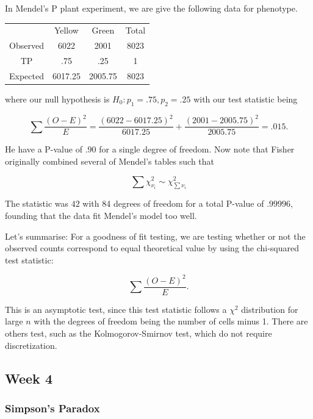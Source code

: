 \documentclass{homework}
\begin{document}
\begin{tcolorbox}[title=Example 2 of Goodness of Fit Testing]

In Mendel's P plant experiment, we are give the following data for phenotype. 

\begin{center}
\begin{tabular}{ |c|c|c|c| } 
 \hline
 & Yellow & Green & Total  \\
 Observed & 6022 & 2001 & 8023 \\ 
 TP & .75 & .25 & 1 \\
 Expected & 6017.25 & 2005.75 & 8023 \\
\hline
\end{tabular}
\end{center}

where our null hypothesis is $H_0: p_1 = .75, p_2 = .25$ with our test statistic being 

$$
\sum \frac{(O-E)^2}{E} = \frac{(6022-6017.25)^2}{6017.25} + \frac{(2001-2005.75)^2}{2005.75} =.015.
$$

He have a P-value of $.90$ for a single degree of freedom. Now note that Fisher originally combined several of Mendel's tables such that 

$$
\sum \chi^2_{\nu_i} \sim \chi^2_{\sum \nu_i}
$$

The statistic was $42$ with 84 degrees of freedom for a total P-value of $.99996$, founding that the data fit Mendel's model too well. 
\end{tcolorbox}

Let's summarise: For a goodness of fit testing, we are testing whether or not the observed counts correspond to equal theoretical value by using the chi-squared test statistic:

$$
\sum \frac{(O-E)^2}{E}.
$$

This is an asymptotic test, since this test statistic follows a $\chi^2$ distribution for large $n$ with the degrees of freedom being the number of cells minus 1. There are others test, such as the Kolmogorov-Smirnov test, which do not require discretization. 
\clearpage

\subsection{Week 4}

\subsubsection{Simpson's Paradox}
\end{document}
